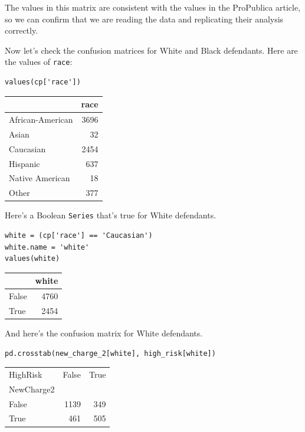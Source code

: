 The values in this matrix are consistent with the values in the
ProPublica article, so we can confirm that we are reading the data and
replicating their analysis correctly.

Now let's check the confusion matrices for White and Black defendants.
Here are the values of \passthrough{\lstinline!race!}:

\begin{lstlisting}[]
values(cp['race'])
\end{lstlisting}

\begin{tabular}{lr}
\midrule
{} &  race \\
\midrule
African-American &  3696 \\
Asian            &    32 \\
Caucasian        &  2454 \\
Hispanic         &   637 \\
Native American  &    18 \\
Other            &   377 \\
\midrule
\end{tabular}

Here's a Boolean \passthrough{\lstinline!Series!} that's true for White
defendants.

\begin{lstlisting}[]
white = (cp['race'] == 'Caucasian')
white.name = 'white'
values(white)
\end{lstlisting}

\begin{tabular}{lr}
\midrule
{} &  white \\
\midrule
False &   4760 \\
True  &   2454 \\
\midrule
\end{tabular}

And here's the confusion matrix for White defendants.

\begin{lstlisting}[]
pd.crosstab(new_charge_2[white], high_risk[white])
\end{lstlisting}

\begin{tabular}{lrr}
\midrule
HighRisk &  False &  True \\
NewCharge2 &        &       \\
\midrule
False      &   1139 &   349 \\
True       &    461 &   505 \\
\midrule
\end{tabular}

